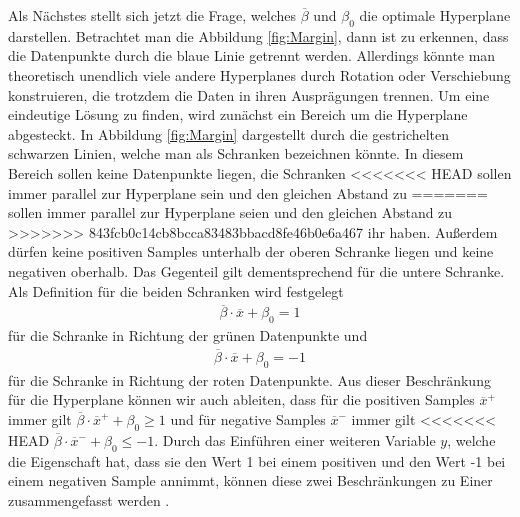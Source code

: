 \documentclass[
]{article}
\begin{document}
Als Nächstes stellt sich jetzt die Frage, welches \(\overline{\beta}\)
und \(\beta_0\) die optimale Hyperplane darstellen. Betrachtet man die
Abbildung \ref{fig:Margin}, dann ist zu erkennen, dass die Datenpunkte
durch die blaue Linie getrennt werden. Allerdings könnte man theoretisch
unendlich viele andere Hyperplanes durch Rotation oder Verschiebung
konstruieren, die trotzdem die Daten in ihren Ausprägungen trennen. Um
eine eindeutige Lösung zu finden, wird zunächst ein Bereich um die
Hyperplane abgesteckt. In Abbildung \ref{fig:Margin} dargestellt durch
die gestrichelten schwarzen Linien, welche man als Schranken bezeichnen
könnte. In diesem Bereich sollen keine Datenpunkte liegen, die Schranken
<<<<<<< HEAD
sollen immer parallel zur Hyperplane sein und den gleichen Abstand zu
=======
sollen immer parallel zur Hyperplane seien und den gleichen Abstand zu
>>>>>>> 843fcb0c14cb8bcca83483bbacd8fe46b0e6a467
ihr haben. Außerdem dürfen keine positiven Samples unterhalb der oberen
Schranke liegen und keine negativen oberhalb. Das Gegenteil gilt
dementsprechend für die untere Schranke. Als Definition für die beiden
Schranken wird festgelegt \begin{align}
\overline{\beta}\cdot \overline{x}+\beta_0=1\label{eq:posSV}
\end{align} für die Schranke in Richtung der grünen Datenpunkte und
\begin{align}
\overline{\beta}\cdot \overline{x}+\beta_0=-1\label{eq:negSV}
\end{align} für die Schranke in Richtung der roten Datenpunkte. Aus
dieser Beschränkung für die Hyperplane können wir auch ableiten, dass
für die positiven Samples \(\overline{x}^+\) immer gilt
\(\overline{\beta}\cdot \overline{x}^++\beta_0\ge 1\) und für negative
Samples \(\overline{x}^-\) immer gilt
<<<<<<< HEAD
\(\overline{\beta}\cdot \overline{x}^-+\beta_0\le -1\). Durch das
Einführen einer weiteren Variable \(y\), welche die Eigenschaft hat,
dass sie den Wert 1 bei einem positiven und den Wert -1 bei einem
negativen Sample annimmt, können diese zwei Beschränkungen zu Einer
zusammengefasst werden \parencite{cortesSupportvectorNetworks1995}.
\end{document}
